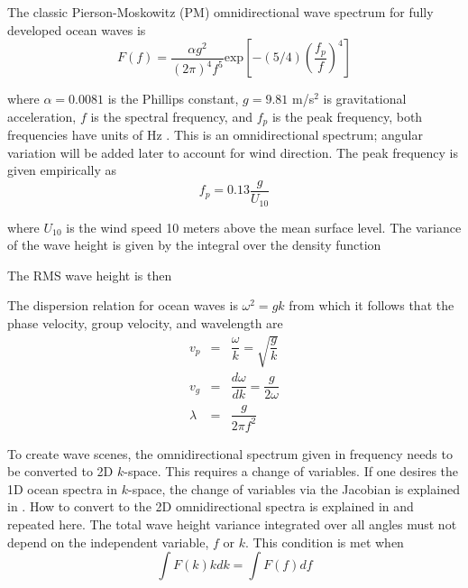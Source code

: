 The classic Pierson-Moskowitz (PM) omnidirectional wave spectrum for fully developed ocean waves is 
\begin{equation}
F(f) = \dfrac{\alpha g^2}{\left(2\pi\right)^4 f^{5}} \textrm{exp}\left[-(5/4)\left(\dfrac{f_p}{f}\right)^4\right]
\end{equation}

\noindent where $\alpha = 0.0081$ is the Phillips constant, $g = 9.81$ m/s$^2$ is gravitational acceleration, $f$ is the spectral frequency, and $f_p$ is the peak frequency, both frequencies have units of Hz \cite{alves2003revisiting}.  This is an omnidirectional spectrum; angular variation will be added later to account for wind direction. The peak frequency is given empirically as 
\begin{equation}
f_p = 0.13 \dfrac{g}{U_{10}}
\end{equation}

\noindent where $U_{10}$ is the wind speed 10 meters above the mean surface level.  The variance of the wave height is given by the integral over the density function 

The RMS wave height is then 

The dispersion relation for ocean waves is $\omega^2  = g k$ from which it follows that the phase velocity, group velocity, and wavelength are
\begin{eqnarray}
v_p &=& \dfrac{\omega}{k} = \sqrt{\dfrac{g}{k}} \\
v_g &=& \dfrac{d\omega}{dk} = \dfrac{g}{2\omega} \\
\lambda & = & \dfrac{g}{2 \pi f^2}
\end{eqnarray}

To create wave scenes, the omnidirectional spectrum given in frequency needs to be converted to 2D $k$-space.  This requires a change of variables.  If one desires the 1D ocean spectra in $k$-space, the change of variables via the Jacobian is explained in \cite{tolman2009user}.  How to convert to the 2D omnidirectional spectra is explained in \cite{plant2009ocean} and repeated here.  The total wave height variance integrated over all angles must not depend on the independent variable, $f$ or $k$.  This condition is met when 
\begin{equation}
\int F(k) k dk = \int F(f) df
\end{equation}

